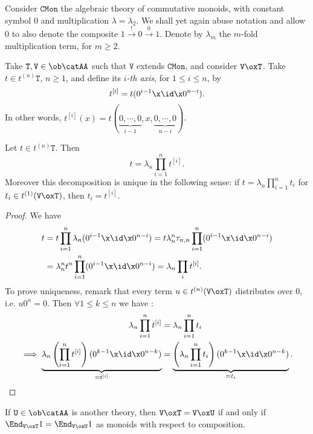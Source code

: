 \documentclass[a4paper, 12pt]{article}
\newcommand{\theory}{\mathtt}
\begin{document}
Consider $\theory{CMon}$ the algebraic theory of commutative monoids, with constant symbol $0$ and multiplication $\lambda = \lambda_2$. We shall yet again abuse notation and allow $0$ to also denote the composite $1 \stackrel{!}{\longrightarrow} 0 \stackrel{0}{\longrightarrow} 1$. Denote by $\lambda_m$ the $m$-fold multiplication term, for $m \geq 2$.

Take $\theory{T}, \theory{V} \in \ob \catAA$ such that $\theory{V}$ extends $\theory{CMon}$, and consider $\theory{V} \ox \theory{T}$. Take $t \in t^{(n)} \theory{T}$, $n \geq 1$, and define its \emph{$i$-th axis}, for $1 \leq i \leq n$, by
\[ t^{[i]} = t ( 0^{i - 1} \x \id \x 0^{n - i} ) . \]
In other words, $t^{[i]} (x) = t (\underbrace{0, \cdots, 0}_{i - 1}, x, \underbrace{0, \cdots, 0}_{n - i})$.

\begin{theorem}
	Let $t \in t^{(n)} \theory{T}$. Then
	\[ t = \lambda_n \prod_{i=1}^n t^{[i]} . \]
	Moreover this decomposition is unique in the following sense: if $t = \lambda_n \prod_{i=1}^n t_i$ for $t_i \in t^{(1)} (\theory{V} \ox \theory{T})$, then $t_i = t^{[i]}$.
\end{theorem}
\begin{proof}
	We have
	\begin{align*}
		t &= t \prod_{i = 1}^n \lambda_n (0^{i - 1} \x \id \x 0^{n - i})
		 = t \lambda_n^n \tau_{n, n} \prod_{i = 1}^n (0^{i - 1} \x \id \x 0^{n - i}) \\
		&= \lambda_n^n t^n \prod_{i = 1}^n (0^{i - 1} \x \id \x 0^{n - i})
		 = \lambda_n \prod_i t^{[i]} .
	\end{align*}
	To prove uniqueness, remark that every term $u \in t^{(n)} (\theory{V} \ox \theory{T})$ distributes over $0$, i.e. $u 0^n = 0$. Then $\forall 1 \leq k \leq n$ we have :
	\begin{align*}
	    \lambda_n \prod_{i=1}^n t^{[i]} &= \lambda_n \prod_{i=1}^n t_i \\
	    \implies \underbrace{ \lambda_n \left( \prod_{i=1}^n t^{[i]} \right) (0^{k-1} \x \id \x 0^{n-k}) }_{= t^{[i]}}
	    &= \underbrace{ \left( \lambda_n \prod_{i=1}^n t_i \right) (0^{k-1} \x \id \x 0^{n-k}) }_{= t_i} .
	\end{align*}
\end{proof}

\begin{corollary}
    If $\theory{U} \in \ob \catAA$ is another theory, then $\theory{V} \ox \theory{T} = \theory{V} \ox \theory{U}$ if and only if $\End_{\theory{V} \ox \theory{T}} 1 = \End_{\theory{V} \ox \theory{U}} 1$ as monoids with respect to composition. 
\end{corollary}
\end{document}
